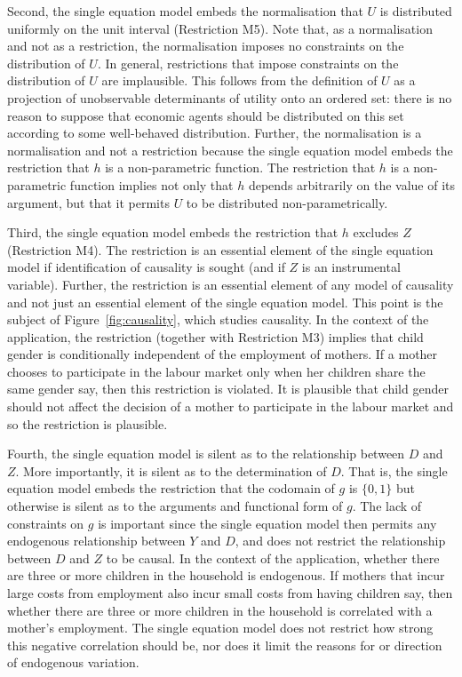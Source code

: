 \documentclass[10pt,a4paper,twoside]{article}
\numberwithin{equation}{section}
\begin{document}
Second, the single equation model embeds the normalisation that $U$ is distributed uniformly on the unit interval (Restriction M5). Note that, as a normalisation and not as a restriction, the normalisation imposes no constraints on the distribution of $U$. In general, restrictions that impose constraints on the distribution of $U$ are implausible. This follows from the definition of $U$ as a projection of unobservable determinants of utility onto an ordered set: there is no reason to suppose that economic agents should be distributed on this set according to some well-behaved distribution. Further, the normalisation is a normalisation and not a restriction because the single equation model embeds the restriction that $h$ is a non-parametric function. The restriction that $h$ is a non-parametric function implies not only that $h$ depends arbitrarily on the value of its argument, but that it permits $U$ to be distributed non-parametrically. 

Third, the single equation model embeds the restriction that $h$ excludes $Z$ (Restriction M4). The restriction is an essential element of the single equation model if identification of causality is sought (and if $Z$ is an instrumental variable). Further, the restriction is an essential element of any model of causality and not just an essential element of the single equation model. This point is the subject of Figure~\ref{fig:causality}, which studies causality. In the context of the application, the restriction (together with Restriction M3) implies that child gender is conditionally independent of the employment of mothers. If a mother chooses to participate in the labour market only when her children share the same gender say, then this restriction is violated. It is plausible that child gender should not affect the decision of a mother to participate in the labour market and so the restriction is plausible.     

Fourth, the single equation model is silent as to the relationship between $D$ and $Z$. More importantly, it is silent as to the determination of $D$. That is, the single equation model embeds the restriction that the codomain of $g$ is $\lbrace 0,1\rbrace$ but otherwise is silent as to the arguments and functional form of $g$. The lack of constraints on $g$ is important since the single equation model then permits any endogenous relationship between $Y$ and $D$, and does not restrict the relationship between $D$ and $Z$ to be causal. In the context of the application, whether there are three or more children in the household is endogenous. If mothers that incur large costs from employment also incur small costs from having children say, then whether there are three or more children in the household is correlated with a mother's employment. The single equation model does not restrict how strong this negative correlation should be, nor does it limit the reasons for or direction of endogenous variation. 
\end{document}
